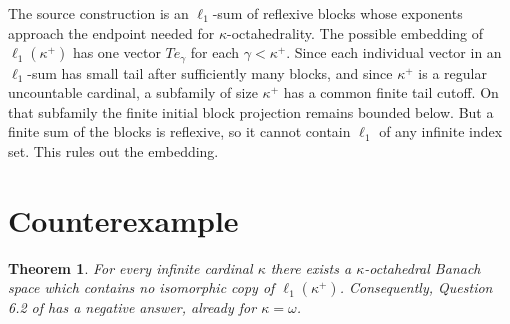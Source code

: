 \documentclass[11pt]{article}
\newtheorem{theorem}{Theorem}
\begin{document}
The source construction is an $\ell_1$-sum of reflexive blocks whose exponents
approach the endpoint needed for $\kappa$-octahedrality.  The possible
embedding of $\ell_1(\kappa^+)$ has one vector $Te_\gamma$ for each
$\gamma<\kappa^+$.  Since each individual vector in an $\ell_1$-sum has small
tail after sufficiently many blocks, and since $\kappa^+$ is a regular
uncountable cardinal, a subfamily of size $\kappa^+$ has a common finite tail
cutoff.  On that subfamily the finite initial block projection remains bounded
below.  But a finite sum of the blocks is reflexive, so it cannot contain
$\ell_1$ of any infinite index set.  This rules out the embedding.

\section{Counterexample}

\begin{theorem}
For every infinite cardinal $\kappa$ there exists a $\kappa$-octahedral Banach
space which contains no isomorphic copy of $\ell_1(\kappa^+)$.  Consequently,
Question 6.2 of \cite{CLL} has a negative answer, already for
$\kappa=\omega$.
\end{theorem}
\end{document}

